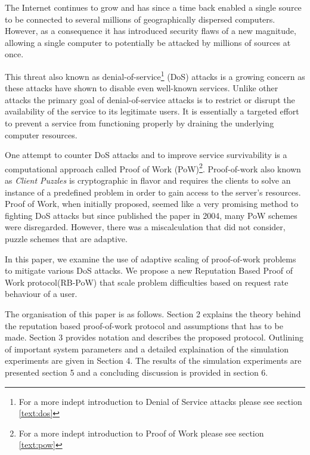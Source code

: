 The Internet continues to grow and has since a time back enabled a single source to be connected to several millions of geographically dispersed computers. However, as a consequence it has introduced security flaws of a new magnitude, allowing a single computer to potentially be attacked by millions of sources at once. 

This threat also known as denial-of-service\footnote{For a more indept introduction to Denial of Service attacks please see section \ref{text:dos}} (DoS) attacks is a growing concern as these attacks have shown to disable even well-known services. Unlike other attacks the primary goal of denial-of-service attacks is to restrict or disrupt the availability of the service to its legitimate users. It is essentially a targeted effort to prevent a service from functioning properly by draining the underlying computer resources. 

One attempt to counter DoS attacks and to improve service survivability is a computational approach called Proof of Work (PoW)\footnote{For a more indept introduction to Proof of Work please see section \ref{text:pow}}. Proof-of-work also known as \emph{Client Puzzles}\cite{dosauth, JuelsB99} is cryptographic in flavor and requires the clients to solve an instance of a predefined problem in order to gain access to the server’s resources. Proof of Work, when initially proposed, seemed like a very promising method to fighting DoS attacks but since \citeauthor{LaurieC04} published the paper  in 2004, many PoW schemes were disregarded. However, there was a miscalculation that \citeauthor{LaurieC04} did not consider, puzzle schemes that are adaptive\cite{Green,gunter}.

In this paper, we examine the use of adaptive scaling of proof-of-work problems to mitigate various DoS attacks. We propose a new Reputation Based Proof of Work protocol(RB-PoW) that scale problem difficulties based on request rate behaviour of a user.

The organisation of this paper is as follows. Section 2 explains the theory behind the reputation based proof-of-work protocol and assumptions that has to be made. Section 3 provides notation and describes the proposed protocol. Outlining of important system parameters and a detailed explaination of the simulation experiments are given in Section 4. The results of the simulation experiments are presented section 5 and a concluding discussion is provided in section 6.



